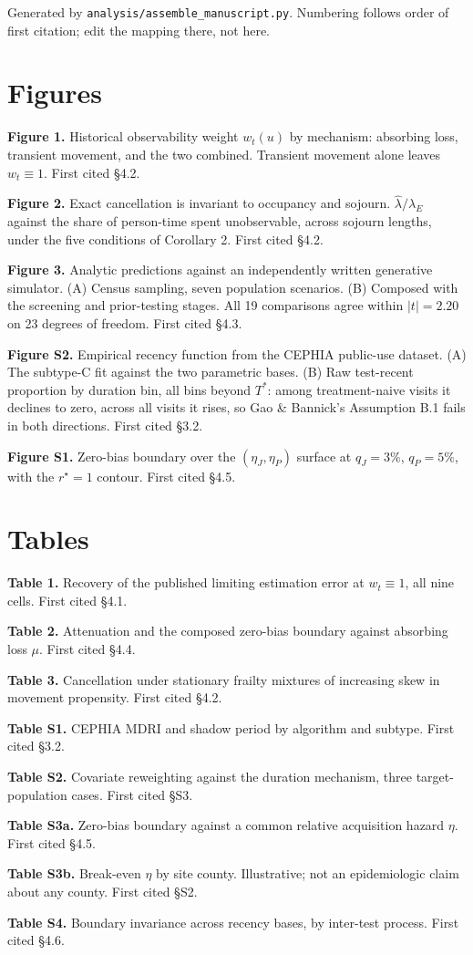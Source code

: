 Generated by \texttt{analysis/assemble\_manuscript.py}. Numbering follows order of first citation; edit the mapping there, not here.

\section{Figures}

\textbf{Figure 1.} Historical observability weight \(w_t(u)\) by mechanism: absorbing loss, transient movement, and the two combined. Transient movement alone leaves \(w_t\equiv1\). First cited §4.2.

\textbf{Figure 2.} Exact cancellation is invariant to occupancy and sojourn. \(\hat\lambda/\lambda_E\) against the share of person-time spent unobservable, across sojourn lengths, under the five conditions of Corollary 2. First cited §4.2.

\textbf{Figure 3.} Analytic predictions against an independently written generative simulator. (A) Census sampling, seven population scenarios. (B) Composed with the screening and prior-testing stages. All 19 comparisons agree within \(|t|=2.20\) on 23 degrees of freedom. First cited §4.3.

\textbf{Figure S2.} Empirical recency function from the CEPHIA public-use dataset. (A) The subtype-C fit against the two parametric bases. (B) Raw test-recent proportion by duration bin, all bins beyond \(T^*\): among treatment-naive visits it declines to zero, across all visits it rises, so Gao \& Bannick's Assumption B.1 fails in both directions. First cited §3.2.

\textbf{Figure S1.} Zero-bias boundary over the \((\eta_J,\eta_P)\) surface at \(q_J=3\%\), \(q_P=5\%\), with the \(r^\star=1\) contour. First cited §4.5.

\section{Tables}

\textbf{Table 1.} Recovery of the published limiting estimation error at \(w_t\equiv1\), all nine cells. First cited §4.1.

\textbf{Table 2.} Attenuation and the composed zero-bias boundary against absorbing loss \(\mu\). First cited §4.4.

\textbf{Table 3.} Cancellation under stationary frailty mixtures of increasing skew in movement propensity. First cited §4.2.

\textbf{Table S1.} CEPHIA MDRI and shadow period by algorithm and subtype. First cited §3.2.

\textbf{Table S2.} Covariate reweighting against the duration mechanism, three target-population cases. First cited §S3.

\textbf{Table S3a.} Zero-bias boundary against a common relative acquisition hazard \(\eta\). First cited §4.5.

\textbf{Table S3b.} Break-even \(\eta\) by site county. Illustrative; not an epidemiologic claim about any county. First cited §S2.

\textbf{Table S4.} Boundary invariance across recency bases, by inter-test process. First cited §4.6.
